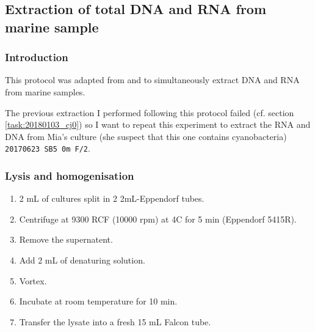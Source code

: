 \subsection{Extraction of total DNA and RNA from marine sample}
\label{task:20180109_cj0}

\subsubsection{Introduction}

This protocol was adapted from \citet{schneider2017extraction} and \citet{chomczynski2006single} to simultaneously extract DNA and RNA from marine samples.

The previous extraction I performed following this protocol failed (cf. section \ref{task:20180103_cj0}) so I want to repeat this experiment to extract the RNA and DNA from Mia's culture (she suspect that this one contains cyanobacteria) \texttt{20170623 SB5 0m F/2}.


\subsubsection{Lysis and homogenisation}

\begin{enumerate}
\item 2 mL of cultures split in 2 2mL-Eppendorf tubes.
\item Centrifuge at 9300 RCF (10000 rpm) at 4\degree C for 5 min (Eppendorf 5415R).
\item Remove the supernatent.
\item Add 2 mL of denaturing solution.
\item Vortex.
\item Incubate at room temperature for 10 min.
\item Transfer the lysate into a fresh 15 mL Falcon tube.
\end{enumerate}


